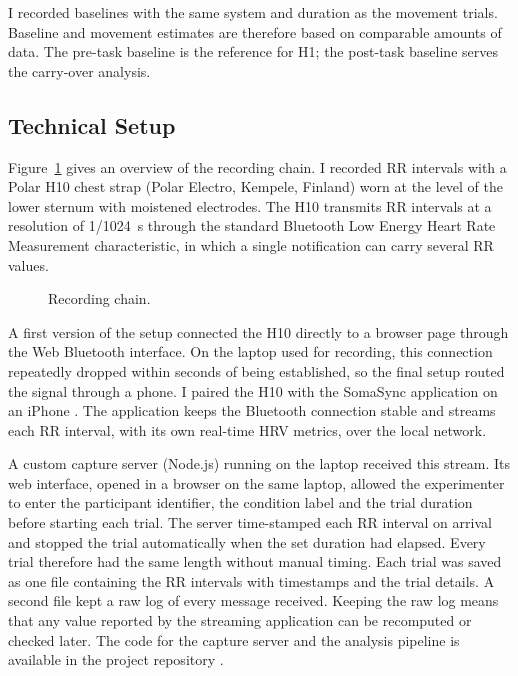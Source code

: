 I recorded baselines with the same system and duration as the movement trials. Baseline and movement estimates are therefore based on comparable amounts of data. The pre-task baseline is the reference for H1; the post-task baseline serves the carry-over analysis.

\subsection{Technical Setup}
\label{sec:setup}

Figure~\ref{fig:setup} gives an overview of the recording chain. I recorded RR intervals with a Polar H10 chest strap (Polar Electro, Kempele, Finland) worn at the level of the lower sternum with moistened electrodes. The H10 transmits RR intervals at a resolution of 1/1024~s through the standard Bluetooth Low Energy Heart Rate Measurement characteristic, in which a single notification can carry several RR values.

\begin{figure}[ht]
\centering
{}
\caption{Recording chain. }
\label{fig:setup}
\end{figure}

A first version of the setup connected the H10 directly to a browser page through the Web Bluetooth interface. On the laptop used for recording, this connection repeatedly dropped within seconds of being established, so the final setup routed the signal through a phone. I paired the H10 with the SomaSync application on an iPhone . The application keeps the Bluetooth connection stable and streams each RR interval, with its own real-time HRV metrics, over the local network.

A custom capture server (Node.js) running on the laptop received this stream. Its web interface, opened in a browser on the same laptop, allowed the experimenter to enter the participant identifier, the condition label and the trial duration before starting each trial. The server time-stamped each RR interval on arrival and stopped the trial automatically when the set duration had elapsed. Every trial therefore had the same length without manual timing. Each trial was saved as one file containing the RR intervals with timestamps and the trial details. A second file kept a raw log of every message received. Keeping the raw log means that any value reported by the streaming application can be recomputed or checked later. The code for the capture server and the analysis pipeline is available in the project repository .

